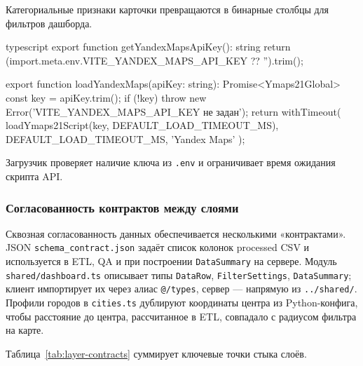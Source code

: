 Категориальные признаки карточки превращаются в бинарные столбцы для фильтров дашборда.

\begin{singleminted}{typescript}
export function getYandexMapsApiKey(): string {
    return (import.meta.env.VITE_YANDEX_MAPS_API_KEY ?? '').trim();
}

export function loadYandexMaps(apiKey: string): Promise<Ymaps21Global> {
    const key = apiKey.trim();
    if (!key) throw new Error('VITE_YANDEX_MAPS_API_KEY не задан');
    return withTimeout(
        loadYmaps21Script(key, DEFAULT_LOAD_TIMEOUT_MS),
        DEFAULT_LOAD_TIMEOUT_MS,
        'Yandex Maps'
    );
}
\end{singleminted}
\label{lst:yandex-maps-loader}

Загрузчик проверяет наличие ключа из \texttt{.env} и ограничивает время ожидания скрипта API.

\subsubsection{Согласованность контрактов между слоями}

Сквозная согласованность данных обеспечивается несколькими «контрактами». JSON \texttt{schema\_contract.json} задаёт список колонок processed CSV и используется в ETL, QA и при построении \texttt{DataSummary} на сервере. Модуль \texttt{shared/dashboard.ts} описывает типы \texttt{DataRow}, \texttt{FilterSettings}, \texttt{DataSummary}; клиент импортирует их через алиас \texttt{@/types}, сервер --- напрямую из \texttt{../shared/}. Профили городов в \texttt{cities.ts} дублируют координаты центра из Python-конфига, чтобы расстояние до центра, рассчитанное в ETL, совпадало с радиусом фильтра на карте.

Таблица~\ref{tab:layer-contracts} суммирует ключевые точки стыка слоёв.

